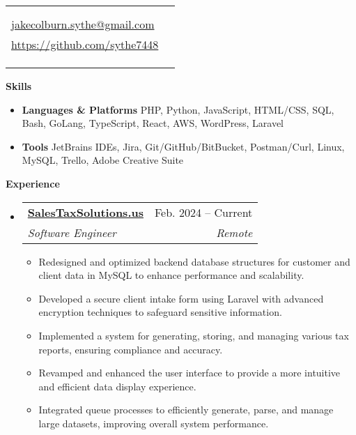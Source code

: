 \documentclass[letterpaper,10pt]{article}[leftmargin=*]
\makeatletter
\def \fullname {Jake Colburn}
\def \subtitle {}
\def \linkedinicon {\faLinkedin}
\def \linkedinlink {https://www.linkedin.com/in/jake-colburn-71401811/}
\def \linkedintext {/jake-colburn}
\def \phoneicon {\faPhone}
\def \phonetext {512-621-6131}
\def \emailicon {\faEnvelope}
\def \emaillink {mailto:jakecolburn.sythe@gmail.com}
\def \emailtext {jakecolburn.sythe@gmail.com}
\def \websiteicon {\faGithub}
\def \websitelink {https://github.com/sythe7448}
\def \websitetext {https://github.com/sythe7448}
\def \headertype {\singlecol} %
\def \entryspacing {-0pt}
\def \linkedin {\linkedinicon \hspace{3pt}\href{\linkedinlink}{\linkedintext}}
\def \phone {\phoneicon \hspace{3pt}{ \phonetext}}
\def \email {\emailicon \hspace{3pt}\href{\emaillink}{\emailtext}}
\def \website {\websiteicon \hspace{3pt}\href{\websitelink}{\websitetext}}
\renewcommand{\section}[2]{\vspace{5pt}
  \colorbox{secondary}{\color{white}\raggedbottom\normalsize\textbf{{#1}{\hspace{7pt}#2}}}
}
\newcommand{\resumeEntryStart}{\begin{itemize}[leftmargin=2.5mm]}
\newcommand{\resumeEntryEnd}{\end{itemize}\vspace{\entryspacing}}
\newcommand{\resumeItemListStart}{\begin{itemize}[leftmargin=4.5mm]}
\newcommand{\resumeItemListEnd}{\end{itemize}}
\newcommand{\resumeItem}[1]{
  \item\small{
    {#1 \vspace{-2pt}}
  }
}
\newcommand{\resumeEntryTSDL}[4]{
  \vspace{-1pt}\item[]
    \begin{tabularx}{0.97\textwidth}{X@{\hspace{60pt}}r}
      \textbf{\color{primary}#1} & {\firabook\color{accent}\small#2} \\
      \textit{\color{accent}\small#3} & \textit{\color{accent}\small#4} \\
    \end{tabularx}\vspace{-6pt}
}
\newcommand{\resumeEntryS}[2]{
  \item[]\small{
    \textbf{\color{primary}#1 }{ #2 \vspace{-6pt}}
  }
}
\newcommand{\doublecol}[6]{
  \begin{tabularx}{\textwidth}{Xr}
    {
      \begin{tabular}[c]{l}
        \fontsize{35}{45}\selectfont{\color{primary}{{\textbf{\fullname}}}} \\
        {\textit{\subtitle}} %
      \end{tabular}
    } & {
      \begin{tabular}[c]{l@{\hspace{1.5em}}l}
        {\small#4} & {\small#1} \\
        {\small#5} & {\small#2} \\
        {\small#6} & {\small#3}
      \end{tabular}
    }
  \end{tabularx}
}
\newcommand{\singlecol}[6]{
  \begin{tabularx}{\textwidth}{Xr}
    {
      \begin{tabular}[b]{l}
        \fontsize{35}{45}\selectfont{\color{primary}{{\textbf{\fullname}}}} \\
        {\textit{\subtitle}} %
      \end{tabular}
    } & {
      \begin{tabular}[c]{l}
        {\small#1} \\
        {\small#2} \\
        {\small#3} \\
        {\small#4} \\
        {\small#5} \\
        {\small#6}
      \end{tabular}
    }
  \end{tabularx}
}
\makeatother
\begin{document}


\headertype{\linkedin}{\email}{\website}{\phone}{}{} %
\vspace{-10pt} %

\section{\faGears}{Skills}
 \resumeEntryStart
  \resumeEntryS{Languages \& Platforms} { PHP, Python, JavaScript, HTML/CSS, SQL, Bash, GoLang, TypeScript, React, AWS, WordPress, Laravel}
  \resumeEntryS{Tools } {JetBrains IDEs, Jira, Git/GitHub/BitBucket, Postman/Curl, Linux, MySQL, Trello, Adobe Creative Suite}
 \resumeEntryEnd

\section{\faPieChart}{Experience}

  \resumeEntryStart
  \resumeEntryTSDL
    {\href{https://www.salestaxsolutions.us/}{SalesTaxSolutions.us}}{Feb. 2024 -- Current}
    {Software Engineer}{Remote}
  \resumeItemListStart
    \resumeItem{Redesigned and optimized backend database structures for customer and client data in MySQL to enhance performance and scalability.}
    \resumeItem{Developed a secure client intake form using Laravel with advanced encryption techniques to safeguard sensitive information.}
    \resumeItem{Implemented a system for generating, storing, and managing various tax reports, ensuring compliance and accuracy.}
    \resumeItem{Revamped and enhanced the user interface to provide a more intuitive and efficient data display experience.}
    \resumeItem{Integrated queue processes to efficiently generate, parse, and manage large datasets, improving overall system performance.}
  \resumeItemListEnd
  \resumeEntryEnd
\end{document}
